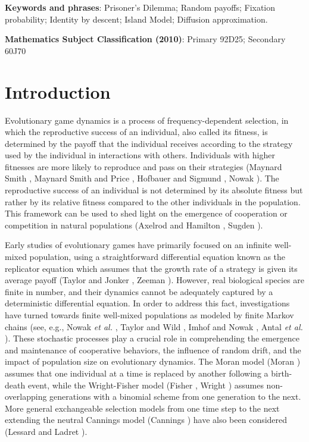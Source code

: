\documentclass[11pt]{article}
\begin{document}

\noindent \textbf{Keywords and phrases}:  Prisoner's Dilemma; Random payoffs; Fixation probability; Identity by descent; Island Model; Diffusion approximation.  

\noindent \textbf{Mathematics Subject Classification (2010)}: Primary 92D25; Secondary 60J70



\section{Introduction}


Evolutionary game dynamics is a process of frequency-dependent selection, in which the reproductive success of an individual, also called its fitness, is determined by the payoff that the individual receives  according to the strategy used by the individual in interactions with others. Individuals with higher fitnesses are more likely to reproduce and pass on their strategies (Maynard Smith \cite{M1982}, Maynard Smith and Price \cite{MP1973}, Hofbauer and Sigmund \cite{HS1988}, Nowak \cite{N2006}). The reproductive success of an individual is not determined by its absolute fitness but rather by its relative fitness compared to the other individuals in the population. This framework can be used to shed light on the emergence of cooperation or competition in natural populations (Axelrod and Hamilton \cite{AH1981}, Sugden \cite{S1986}).


Early studies of evolutionary games have primarily focused on an infinite well-mixed population, using a straightforward differential equation known as the replicator equation which assumes that the growth rate of a strategy is given its average payoff (Taylor and Jonker \cite{TJ1978}, Zeeman \cite{Z1980}). However, real biological species are finite in number, and their dynamics cannot be adequately captured by a deterministic differential equation. In order to address this fact, investigations have turned towards finite well-mixed populations as modeled by finite Markov chains (see, e.g., Nowak \textit{et al.} \cite{NSTF2004}, Taylor and Wild \cite{WT2004}, Imhof and Nowak \cite{IN2006}, Antal \textit{et al.} \cite{ANT2009}). These stochastic processes play a crucial role in comprehending the emergence and maintenance of cooperative behaviors, the influence of random drift, and the impact of population size on evolutionary dynamics.
The Moran model  (Moran \cite{M1958}) assumes that one individual at a time is replaced by another following a birth-death event, while the Wright-Fisher model (Fisher \cite{F1930}, Wright \cite{W1931}) assumes non-overlapping generations with a binomial scheme from one generation to the next. More general exchangeable selection models from one time step to the next extending the neutral Cannings model (Cannings \cite{Cannings1974}) have also been considered (Lessard and Ladret \cite{LL2007}). 
\end{document}
